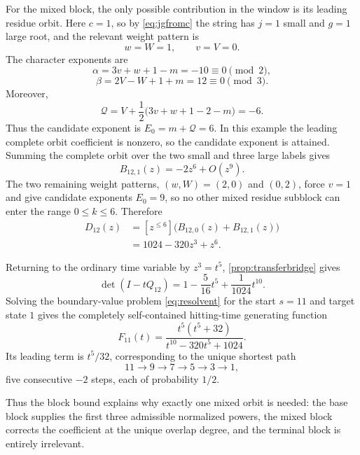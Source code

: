 \documentclass[11pt]{amsart}
\theoremstyle{remark}
\begin{document}
For the mixed block, the only possible contribution in the window is its leading residue orbit.  Here $c=1$, so by \eqref{eq:jgfromc} the string has $j=1$ small and $g=1$ large root, and the relevant weight pattern is
\[
    w=W=1,
    \qquad
    v=V=0.
\]
The character exponents are
\[
    \alpha=3v+w+1-m=-10\equiv0\pmod2,
\]
\[
    \beta=2V-W+1+m=12\equiv0\pmod3.
\]
Moreover,
\begin{equation}\label{eq:Q12}
    \mathcal Q=V+\frac12\bigl(3v+w+1-2-m\bigr)=-6.
\end{equation}
Thus the candidate exponent is $E_0=m+\mathcal Q=6$.  In this example the leading complete orbit coefficient is nonzero, so the candidate exponent is attained.  Summing the complete orbit over the two small and three large labels gives
\begin{equation}\label{eq:mixed12}
    B_{12,1}(z)=-2z^6+O(z^9).
\end{equation}
The two remaining weight patterns, $(w,W)=(2,0)$ and $(0,2)$, force $v=1$ and give candidate exponents $E_0=9$, so no other mixed residue subblock can enter the range $0\leq k\leq6$.  Therefore
\begin{equation}\label{eq:D12}
 \begin{aligned}
    D_{12}(z)
    &=[z^{\leq6}]
      \bigl(B_{12,0}(z)+B_{12,1}(z)\bigr)\\
    &=1024-320z^3+z^6.
 \end{aligned}
\end{equation}

Returning to the ordinary time variable by $z^3=t^5$, \cref{prop:transferbridge} gives
\begin{equation}\label{eq:transfer12}
    \det(I-tQ_{12})
    =1-\frac{5}{16}t^5+\frac{1}{1024}t^{10}.
\end{equation}
Solving the boundary-value problem \eqref{eq:resolvent} for the start $s=11$ and target state $1$ gives the completely self-contained hitting-time generating function
\begin{equation}\label{eq:F12physical}
    F_{11}(t)
    =\frac{t^5(t^5+32)}{t^{10}-320t^5+1024}.
\end{equation}
Its leading term is $t^5/32$, corresponding to the unique shortest path
\[
    11\to9\to7\to5\to3\to1,
\]
five consecutive $-2$ steps, each of probability $1/2$.

Thus the block bound explains why exactly one mixed orbit is needed: the base block supplies the first three admissible normalized powers, the mixed block corrects the coefficient at the unique overlap degree, and the terminal block is entirely irrelevant.
\end{document}

